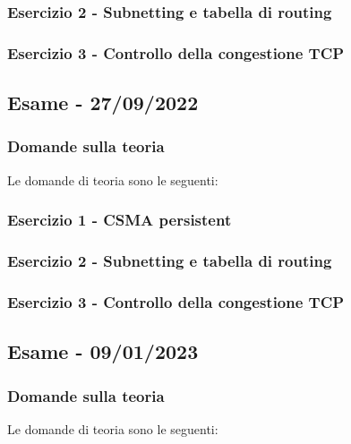 \documentclass[a4paper]{article}
\begin{document}
	\subsubsection{Esercizio 2 - Subnetting e tabella di routing}
	
	\subsubsection{Esercizio 3 - Controllo della congestione TCP}
	
	\newpage

	\subsection[\textbf{Esame - 27/09/2022}]{Esame - 27/09/2022}
	
	\subsubsection{Domande sulla teoria}
	Le domande di teoria sono le seguenti:
	
	\subsubsection{Esercizio 1 - CSMA persistent}
	
	\subsubsection{Esercizio 2 - Subnetting e tabella di routing}
	
	\subsubsection{Esercizio 3 - Controllo della congestione TCP}
	
	\newpage

	\subsection[\textbf{Esame - 09/01/2023}]{Esame - 09/01/2023}
	
	\subsubsection{Domande sulla teoria}
	Le domande di teoria sono le seguenti:
	
\end{document}
